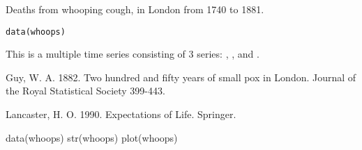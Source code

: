 \begin{Description}\relax
Deaths from whooping cough, in London from 1740 to 1881.
\end{Description}
\begin{Usage}
\begin{verbatim}data(whoops)\end{verbatim}
\end{Usage}
\begin{Format}\relax
This is a multiple time series consisting of 3 series:
, , and .
\end{Format}
\begin{Source}\relax
Guy, W. A. 1882. Two hundred and fifty years of small pox in London.
Journal of the Royal Statistical Society 399-443.
\end{Source}
\begin{References}\relax
Lancaster, H. O. 1990. Expectations of Life. Springer.
\end{References}
\begin{Examples}
\begin{ExampleCode}
data(whoops)
str(whoops)
plot(whoops) 
\end{ExampleCode}
\end{Examples}

